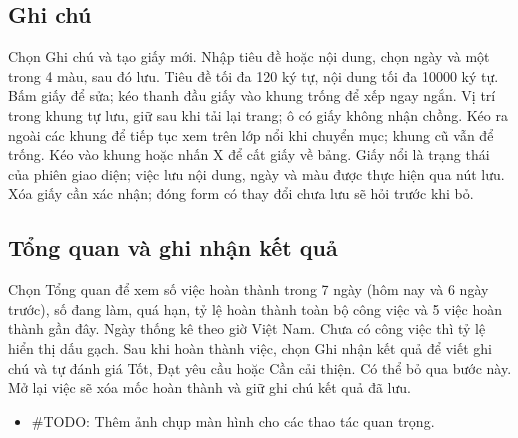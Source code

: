 \subsection{Ghi chú}
Chọn Ghi chú và tạo giấy mới. Nhập tiêu đề hoặc nội dung, chọn ngày và một trong 4 màu,
sau đó lưu. Tiêu đề tối đa 120 ký tự, nội dung tối đa 10000 ký tự.
Bấm giấy để sửa; kéo thanh đầu giấy vào khung trống để xếp ngay ngắn.
Vị trí trong khung tự lưu, giữ sau khi tải lại trang; ô có giấy không nhận chồng.
Kéo ra ngoài các khung để tiếp tục xem trên lớp nổi khi chuyển mục;
khung cũ vẫn để trống. Kéo vào khung hoặc nhấn X để cất giấy về bảng.
Giấy nổi là trạng thái của phiên giao diện;
việc lưu nội dung, ngày và màu được thực hiện qua nút lưu.
Xóa giấy cần xác nhận; đóng form có thay đổi chưa lưu sẽ hỏi trước khi bỏ.

\subsection{Tổng quan và ghi nhận kết quả}
Chọn Tổng quan để xem số việc hoàn thành trong 7 ngày (hôm nay và 6 ngày trước),
số đang làm, quá hạn, tỷ lệ hoàn thành toàn bộ công việc và 5 việc hoàn thành gần đây.
Ngày thống kê theo giờ Việt Nam. Chưa có công việc thì tỷ lệ hiển thị dấu gạch.
Sau khi hoàn thành việc, chọn Ghi nhận kết quả để viết ghi chú và tự đánh giá
Tốt, Đạt yêu cầu hoặc Cần cải thiện. Có thể bỏ qua bước này.
Mở lại việc sẽ xóa mốc hoàn thành và giữ ghi chú kết quả đã lưu.
\begin{itemize}
  \item \#TODO: Thêm ảnh chụp màn hình cho các thao tác quan trọng.
\end{itemize}
